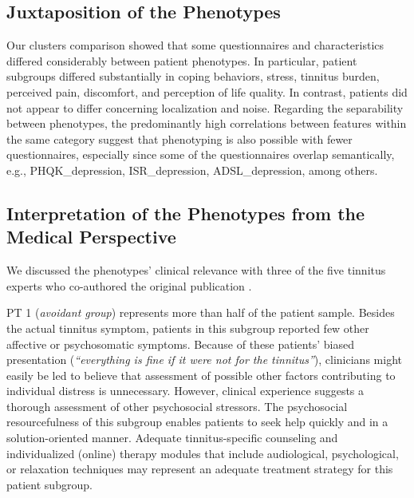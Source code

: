 \documentclass[
  oneside]{book}
\begin{document}
\hypertarget{juxtaposition-of-the-phenotypes}{%
\subsection{Juxtaposition of the Phenotypes}\label{juxtaposition-of-the-phenotypes}}

Our clusters comparison showed that some questionnaires and characteristics differed considerably between patient phenotypes.
In particular, patient subgroups differed substantially in coping behaviors, stress, tinnitus burden, perceived pain, discomfort, and perception of life quality.
In contrast, patients did not appear to differ concerning localization and noise.
Regarding the separability between phenotypes, the predominantly high correlations between features within the same category suggest that phenotyping is also possible with fewer questionnaires, especially since some of the questionnaires overlap semantically, e.g., PHQK\_depression, ISR\_depression, ADSL\_depression, among others.

\hypertarget{interpretation-of-the-phenotypes-from-the-medical-perspective}{%
\subsection{Interpretation of the Phenotypes from the Medical Perspective}\label{interpretation-of-the-phenotypes-from-the-medical-perspective}}

We discussed the phenotypes' clinical relevance with three of the five tinnitus experts who co-authored the original publication \autocite{Niemann:SREP_Pheno2020}.

PT 1 (\emph{avoidant group}) represents more than half of the patient sample.
Besides the actual tinnitus symptom, patients in this subgroup reported few other affective or psychosomatic symptoms.
Because of these patients' biased presentation (\emph{``everything is fine if it were not for the tinnitus''}), clinicians might easily be led to believe that assessment of possible other factors contributing to individual distress is unnecessary.
However, clinical experience suggests a thorough assessment of other psychosocial stressors.
The psychosocial resourcefulness of this subgroup enables patients to seek help quickly and in a solution-oriented manner.
Adequate tinnitus-specific counseling and individualized (online) therapy modules that include audiological, psychological, or relaxation techniques may represent an adequate treatment strategy for this patient subgroup.
\end{document}
